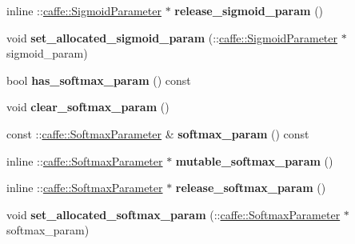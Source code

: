 \begin{DoxyCompactItemize}
inline \+::\mbox{\hyperlink{classcaffe_1_1_sigmoid_parameter}{caffe\+::\+Sigmoid\+Parameter}} $\ast$ {\bfseries release\+\_\+sigmoid\+\_\+param} ()
\item 
\mbox{\label{classcaffe_1_1_layer_parameter_a6e7832faf65dbe6c79184fecae7017af}} 
void {\bfseries set\+\_\+allocated\+\_\+sigmoid\+\_\+param} (\+::\mbox{\hyperlink{classcaffe_1_1_sigmoid_parameter}{caffe\+::\+Sigmoid\+Parameter}} $\ast$sigmoid\+\_\+param)
\item 
\mbox{\label{classcaffe_1_1_layer_parameter_add934108dfad2800a1497a744b402b25}} 
bool {\bfseries has\+\_\+softmax\+\_\+param} () const
\item 
\mbox{\label{classcaffe_1_1_layer_parameter_a89f8bccc3794b5ff43f16aa976a2d942}} 
void {\bfseries clear\+\_\+softmax\+\_\+param} ()
\item 
\mbox{\label{classcaffe_1_1_layer_parameter_a7d202d026ba56db91e307815cd46ba95}} 
const \+::\mbox{\hyperlink{classcaffe_1_1_softmax_parameter}{caffe\+::\+Softmax\+Parameter}} \& {\bfseries softmax\+\_\+param} () const
\item 
\mbox{\label{classcaffe_1_1_layer_parameter_a31eb8c815d285b4202ee553c7c47e9a9}} 
inline \+::\mbox{\hyperlink{classcaffe_1_1_softmax_parameter}{caffe\+::\+Softmax\+Parameter}} $\ast$ {\bfseries mutable\+\_\+softmax\+\_\+param} ()
\item 
\mbox{\label{classcaffe_1_1_layer_parameter_ae18ff2b76c8102f5bb690325a6a4015b}} 
inline \+::\mbox{\hyperlink{classcaffe_1_1_softmax_parameter}{caffe\+::\+Softmax\+Parameter}} $\ast$ {\bfseries release\+\_\+softmax\+\_\+param} ()
\item 
\mbox{\label{classcaffe_1_1_layer_parameter_afaa9b57995c70f36b6870a3384e5787f}} 
void {\bfseries set\+\_\+allocated\+\_\+softmax\+\_\+param} (\+::\mbox{\hyperlink{classcaffe_1_1_softmax_parameter}{caffe\+::\+Softmax\+Parameter}} $\ast$softmax\+\_\+param)
\item 
\mbox{\label{classcaffe_1_1_layer_parameter_a0fe1639dbdb026403a80877701b4475b}} 

\end{DoxyCompactItemize}

